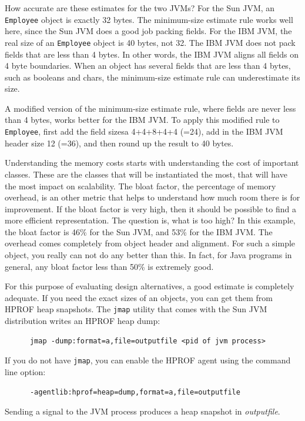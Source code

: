How accurate are these estimates for the two JVMs?  For the Sun JVM, an \texttt{Employee} object is exactly 32 bytes. The minimum-size estimate rule works well here, since the Sun JVM does a good job packing fields. For the IBM JVM, the real size of an \texttt{Employee} object is 40 bytes, not 32. The IBM JVM does not pack fields that are less than 4 bytes. In other words, the IBM JVM aligns all fields on 4 byte boundaries. When an object has several fields that are less than 4 bytes, such as booleans and chars, the minimum-size estimate rule can underestimate its size. 

A modified version of the minimum-size estimate rule, where fields are never less than 4 bytes, works better for the IBM JVM. To apply this modified rule to \texttt{Employee}, first add the field sizesa 4+4+8+4+4 (=24), add in the IBM JVM header size 12 (=36), and then round up the result to 40 bytes.


Understanding the memory costs starts with understanding the cost of important classes.  These are the classes that will be instantiated the most, that will have the most impact on scalability. The bloat factor, the percentage of memory overhead, is an other metric that helps to understand how much room there is for improvement. If the bloat factor is very high, then it should be possible to find a more efficient representation. The question is, what is too high?  
In this example, the bloat factor is 46\% for the Sun JVM, and 53\% for the IBM JVM. The overhead comes completely from object header and alignment. For such a simple object, you really can not do any better than this. In fact, for Java programs in general, any  bloat factor less than 50\% is extremely good.

For this purpose of evaluating design alternatives, a good estimate is completely adequate. If you need the exact sizes of an objects, you can get them from HPROF heap snapshots. The \texttt{jmap} utility that comes with the Sun JVM distribution writes an HPROF heap dump:
\ttfamily
\begin{verbatim} 
      jmap -dump:format=a,file=outputfile <pid of jvm process> 
\end{verbatim}
If you do not have \texttt{jmap}, you can enable the HPROF agent using the command line option: 
\ttfamily
\begin{verbatim} 
      -agentlib:hprof=heap=dump,format=a,file=outputfile
\end{verbatim}
\normalfont
Sending a signal to the JVM process produces a heap snapshot in \textit{outputfile}.


